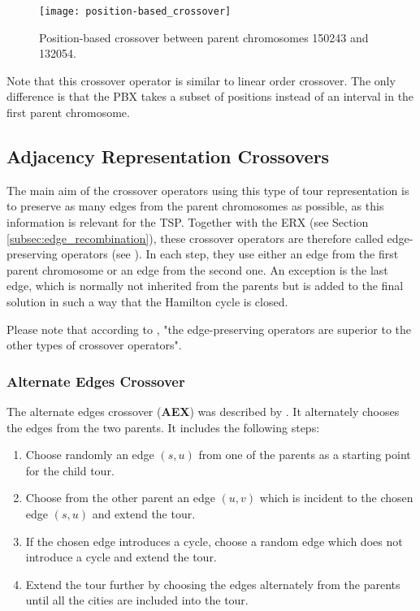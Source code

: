 \begin{figure}[htp] \centering
	\centering
	\texttt{[image: position-based\_crossover]}
	\caption{Position-based crossover between parent chromosomes 150243 and 132054.}
	\label{position-based_crossover}
\end{figure}

Note that this crossover operator is similar to linear order crossover. The only difference is that the PBX takes a subset of positions instead of an interval in the first parent chromosome.\par

\subsection{Adjacency Representation Crossovers}
\label{subsec:adjacency_crossovers}
The main aim of the crossover operators using this type of tour representation is to preserve as many edges from the parent chromosomes as possible, as this information is relevant for the TSP. Together with the ERX (see Section \ref{subsec:edge_recombination}), these crossover operators are therefore called edge-preserving operators (see \cite{potvin1996genetic}). In each step, they use either an edge from the first parent chromosome or an edge from the second one. An exception is the last edge, which is normally not inherited from the parents but is added to the final solution in such a way that the Hamilton cycle is closed. \par

Please note that according to \citeauthor{potvin1996genetic} \cite{potvin1996genetic}, "the edge-preserving operators are superior to the other types of crossover operators".

\subsubsection{Alternate Edges Crossover}
\label{subsubsec:alternate_edges}

The alternate edges crossover (\textbf{AEX}) was described by \citeauthor{grefenstette1985genetic} \cite{grefenstette1985genetic}. It alternately chooses the edges from the two parents. It includes the following steps:

\begin{enumerate}
	\item Choose randomly an edge $(s, u)$ from one of the parents as a starting point for the child tour.
	\item Choose from the other parent an edge $(u, v)$ which is incident to the chosen edge $(s, u)$ and extend the tour.
	\item If the chosen edge introduces a cycle, choose a random edge which does not introduce a cycle and extend the tour.
	\item Extend the tour further by choosing the edges alternately from the parents until all the cities are included into the tour.	 
\end{enumerate}

